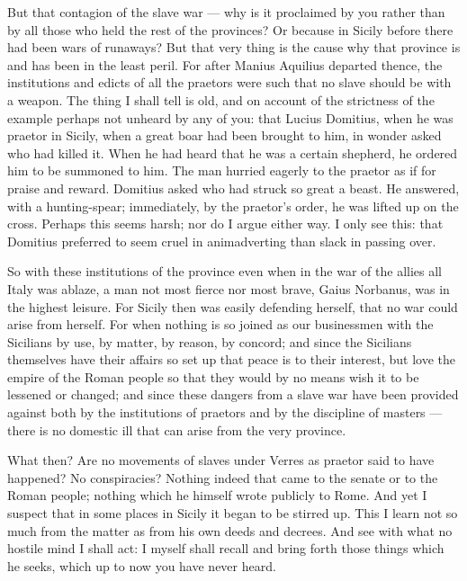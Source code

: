  But that contagion of the slave war --- why is it proclaimed by you rather than by all those who held the rest of the provinces? Or because in Sicily before there had been wars of runaways? But that very thing is the cause why that province is and has been in the least peril. For after Manius Aquilius departed thence, the institutions and edicts of all the praetors were such that no slave should be with a weapon. The thing I shall tell is old, and on account of the strictness of the example perhaps not unheard by any of you: that Lucius Domitius, when he was praetor in Sicily, when a great boar had been brought to him, in wonder asked who had killed it. When he had heard that he was a certain shepherd, he ordered him to be summoned to him. The man hurried eagerly to the praetor as if for praise and reward. Domitius asked who had struck so great a beast. He answered, with a hunting-spear; immediately, by the praetor's order, he was lifted up on the cross. Perhaps this seems harsh; nor do I argue either way. I only see this: that Domitius preferred to seem cruel in animadverting than slack in passing over.

 So with these institutions of the province even when in the war of the allies all Italy was ablaze, a man not most fierce nor most brave, Gaius Norbanus, was in the highest leisure. For Sicily then was easily defending herself, that no war could arise from herself. For when nothing is so joined as our businessmen with the Sicilians by use, by matter, by reason, by concord; and since the Sicilians themselves have their affairs so set up that peace is to their interest, but love the empire of the Roman people so that they would by no means wish it to be lessened or changed; and since these dangers from a slave war have been provided against both by the institutions of praetors and by the discipline of masters --- there is no domestic ill that can arise from the very province.

 What then? Are no movements of slaves under Verres as praetor said to have happened? No conspiracies? Nothing indeed that came to the senate or to the Roman people; nothing which he himself wrote publicly to Rome. And yet I suspect that in some places in Sicily it began to be stirred up. This I learn not so much from the matter as from his own deeds and decrees. And see with what no hostile mind I shall act: I myself shall recall and bring forth those things which he seeks, which up to now you have never heard.

